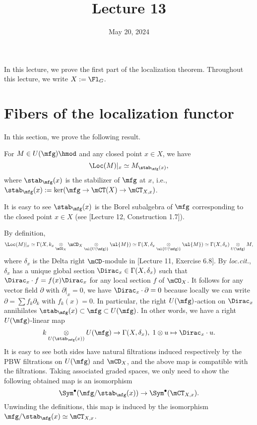 





\title{Lecture 13}

\date{May 20, 2024}

\maketitle

	In this lecture, we prove the first part of the localization theorem. Throughout this lecture, we write $X:=\Fl_G$.

\section{Fibers of the localization functor}

	In this section, we prove the following result.

		\begin{prop}
		\label{prop-fiber-localization}
		For $M \in U(\mfg)\hmod$ and any closed point $x\in X$, we have
		\[
			\Loc(M)|_x \simeq M_{\stab_\mfg(x)},
		\]
		where $\stab_\mfg(x)$ is the stabilizer of $\mfg$ at $x$, i.e., $\stab_\mfg(x):=\ker( \mfg \to \mCT(X) \to \mCT_{X,x}  )$.
	\end{prop}

	\begin{rem}
		It is easy to see $\stab_\mfg(x)$ is the Borel subalgebra of $\mfg$ corresponding to the closed point $x\in X$ (see [Lecture 12, Construction 1.7]).
	\end{rem}

	\proof
		By definition,
		\[
			\Loc(M)|_x \simeq \Gamma(X,k_x \ot_{\mCO_{X}} \mCD_{X} \ot_{\ul{U(\mfg)}} \ul{M}) \simeq \Gamma(X, \delta_x \ot_{ \ul{U(\mfg)} } \ul{M}) \simeq \Gamma(X,\delta_x) \ot_{ U(\mfg) } M,
		\]
		where $\delta_x$ is the Delta right $\mCD$-module in [Lecture 11, Exercise 6.8]. By \emph{loc.cit.}, $\delta_x$ has a unique global section $\Dirac_x\in  \Gamma(X,\delta_x)$ such that $\Dirac_x \cdot f = f(x)\Dirac_x$ for any local section $f$ of $\mCO_{X}$. It follows for any vector field $\partial$ with $\partial|_x =0$, we have $\Dirac_x \cdot \partial = 0$ because locally we can write $\partial=\sum f_k \partial_k$ with $f_k(x)=0$. In particular, the right $U(\mfg)$-action on $\Dirac_x$ annihilates $\stab_\mfg(x) \subset \mfg \subset U(\mfg)$. In other words, we have a right $U(\mfg)$-linear map
		\[
			k\ot_{U(\stab_\mfg(x))} U(\mfg) \to \Gamma(X, \delta_x ),\; 1\ot u \mapsto \Dirac_x \cdot u. 
		\]
		It is easy to see both sides have natural filtrations induced respectively by the PBW filtrations on $U(\mfg)$ and $\mCD_{X}$, and the above map is compatible with the filtrations. Taking associated graded spaces, we only need to show the following obtained map is an isomorphism
		\[
			\Sym^\bullet( \mfg/\stab_\mfg(x) ) \to \Sym^\bullet(\mCT_{X,x}).
		\]
		Unwinding the definitions, this map is induced by the isomorphism $\mfg/\stab_\mfg(x) \simeq \mCT_{X,x}$.

